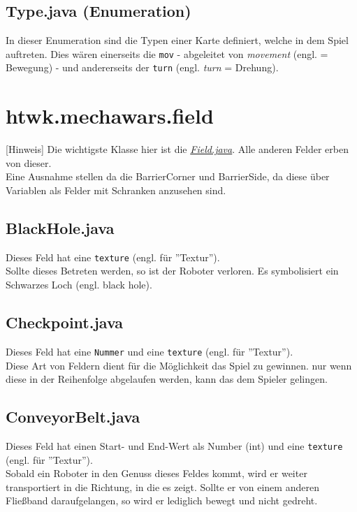 \documentclass[12pt,a4paper,oneside]{book}
\theoremstyle{plain}
\numberwithin{equation}{chapter} \DeclareMathOperator{\Var}{Var}
\begin{document}
\hypertarget{Type.java}{}  
\subsection{Type.java (Enumeration)}
    In dieser Enumeration sind die Typen einer Karte definiert, welche in dem Spiel auftreten. Dies wären einerseits die \texttt{mov} - abgeleitet von \textit{movement} (engl. = Bewegung) - und andererseits der \texttt{turn} (engl. \textit{turn} = Drehung).

\newpage
\section{htwk.mechawars.field}
    [Hinweis] Die wichtigste Klasse hier ist die \hyperlink{Field.java}{\textit{Field.java}}. Alle anderen Felder erben von dieser.\\
    Eine Ausnahme stellen da die BarrierCorner und BarrierSide, da diese über Variablen als Felder mit Schranken anzusehen sind.
    
\subsection{BlackHole.java}
    Dieses Feld hat eine  \texttt{texture} (engl. für ''Textur''). \\
    Sollte dieses Betreten werden, so ist der Roboter verloren. Es symbolisiert ein Schwarzes Loch (engl. black hole).

\subsection{Checkpoint.java}
    Dieses Feld hat eine \texttt{Nummer} und eine \texttt{texture} (engl. für ''Textur''). \\
    Diese Art von Feldern dient für die Möglichkeit das Spiel zu gewinnen. nur wenn diese in der Reihenfolge abgelaufen werden, kann das dem Spieler gelingen.

\hypertarget{ConveyorBelt.java}{}    
\subsection{ConveyorBelt.java}
    Dieses Feld hat einen Start- und End-Wert als Number (int) und eine \texttt{texture} (engl. für ''Textur''). \\
    Sobald ein Roboter in den Genuss dieses Feldes kommt, wird er weiter transportiert in die Richtung, in die es zeigt. Sollte er von einem anderen Fließband daraufgelangen, so wird er lediglich bewegt und nicht gedreht.
    
\end{document}
